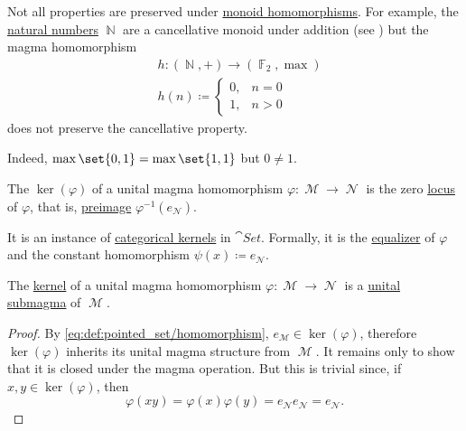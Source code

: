 \begin{example}\label{ex:monoid_cancellation_not_preserved_by_homomorphism}
  Not all properties are preserved under \hyperref[def:unital_magma/homomorphism]{monoid homomorphisms}. For example, the \hyperref[def:set_of_natural_numbers]{natural numbers} \( \BbbN \) are a cancellative monoid under addition (see ) but the magma homomorphism
  \begin{equation*}
    \begin{aligned}
      &h: (\BbbN, +) \to (\hyperref[thm:galois_field_existence]{\BbbF_2}, \max) \\
      &h(n) \coloneqq \begin{cases}
        0, &n = 0 \\
        1, &n > 0
      \end{cases}
    \end{aligned}
  \end{equation*}
  does not preserve the cancellative property.

  Indeed, \( \max\set{ 0, 1} = \max\set{ 1, 1 } \) but \( 0 \neq 1 \).
\end{example}

\begin{definition}\label{def:unital_magma_kernel}
  The  \( \ker(\varphi) \) of a unital magma homomorphism \( \varphi: \mscrM \to \mscrN \) is the zero \hyperref[def:zero_locus]{locus} of \( \varphi \), that is, \hyperref[def:function/preimage]{preimage} \( \varphi^{-1}(e_{\mscrN}) \).

  It is an instance of \hyperref[def:categorical_kernel]{categorical kernels} in \hyperref[def:category_of_sets]{\( \cat{Set} \)}. Formally, it is the \hyperref[thm:set_categorical_limits/equalizer]{equalizer} of \( \varphi \) and the constant homomorphism \( \psi(x) \coloneqq e_{\mscrN} \).
\end{definition}

\begin{proposition}\label{thm:unital_magma_kernel_is_submagma}
  The \hyperref[def:unital_magma_kernel]{kernel} of a unital magma homomorphism \( \varphi: \mscrM \to \mscrN \) is a \hyperref[def:first_order_substructure]{unital submagma} of \( \mscrM \).
\end{proposition}
\begin{proof}
  By \eqref{eq:def:pointed_set/homomorphism}, \( e_{\mscrM} \in \ker(\varphi) \), therefore \( \ker(\varphi) \) inherits its unital magma structure from \( \mscrM \). It remains only to show that it is closed under the magma operation. But this is trivial since, if \( x, y \in \ker(\varphi) \), then
  \begin{equation*}
    \varphi(xy) = \varphi(x) \varphi(y) = e_{\mscrN} e_{\mscrN} = e_{\mscrN}.
  \end{equation*}
\end{proof}
